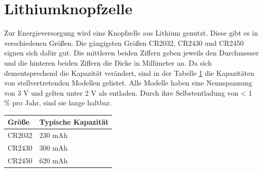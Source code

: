 \section{Lithiumknopfzelle}
Zur Energieversorgung wird eine Knopfzelle aus Lithium genutzt.
Diese gibt es in verschiedenen Größen.
Die gängigsten Größen CR2032, CR2430 und CR2450 eignen sich dafür gut.
Die mittleren beiden Ziffern geben jeweils den Durchmesser und die hinteren beiden Ziffern die Dicke in Millimeter an.
Da sich dementsprechend die Kapazität verändert, sind in der Tabelle \ref{tab:knopfzellen} die Kapazitäten von stellvertretenden Modellen gelistet.
Alle Modelle haben eine Nennspannung von 3 V und gelten unter 2 V als entladen.
Durch ihre Selbstentladung von < 1 \% pro Jahr, sind sie lange haltbar. \cite{datasheet_ds6450}
\begin{table}[h]
	\label{tab:knopfzellen}
	\centering
	\begin{tabular}{l|l}
		Größe & Typische Kapazität\\
		\hline
		CR2032 & 230 mAh \cite{datasheet_ds6032}\\
		CR2430 & 300 mAh \cite{datasheet_ds6430}\\
		CR2450 & 620 mAh \cite{datasheet_ds6450}\\
	\end{tabular}
\end{table}
